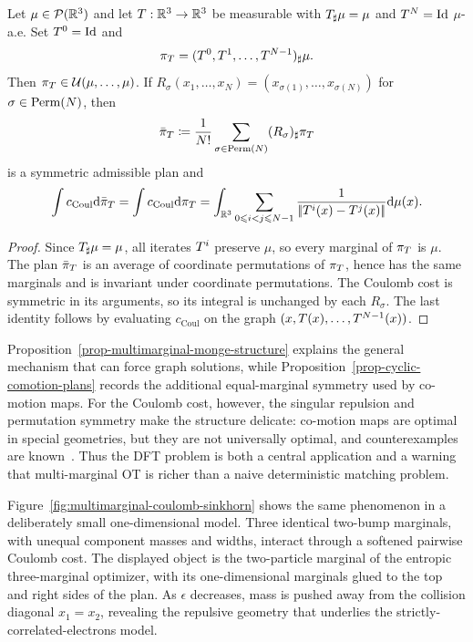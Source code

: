 \begin{prop}\label{prop-cyclic-comotion-plans}
	Let $\mu\in\mathcal{P}(\mathbb{R}^3)$ and let $T:\mathbb{R}^3\to\mathbb{R}^3$ be measurable with $T_\sharp\mu=\mu$ and $T^N=\mathrm{Id}$ $\mu$-a.e. Set $T^0=\mathrm{Id}$ and
	\[
		\pi_T=(T^0,T^1,\ldots,T^{N-1})_\sharp\mu .
	\]
	Then $\pi_T\in\mathcal{U}(\mu,\ldots,\mu)$. If $R_\sigma(x_1,\ldots,x_N)=(x_{\sigma(1)},\ldots,x_{\sigma(N)})$ for $\sigma\in\mathrm{Perm}(N)$, then
	\[
		\bar\pi_T\coloneqq\frac1{N!}\sum_{\sigma\in\mathrm{Perm}(N)}(R_\sigma)_\sharp\pi_T
	\]
	is a symmetric admissible plan and
	\[
		\int c_{\mathrm{Coul}}\mathrm{d}\bar\pi_T
		=
		\int c_{\mathrm{Coul}}\mathrm{d}\pi_T
		=
		\int_{\mathbb{R}^3}
		\sum_{0\leqslant i<j\leqslant N-1}
		\frac{1}{|\!| T^i(x)-T^j(x) |\!|}\mathrm{d}\mu(x).
	\]
\end{prop}
\begin{proof}
	Since $T_\sharp\mu=\mu$, all iterates $T^i$ preserve $\mu$, so every marginal of $\pi_T$ is $\mu$. The plan $\bar\pi_T$ is an average of coordinate permutations of $\pi_T$, hence has the same marginals and is invariant under coordinate permutations. The Coulomb cost is symmetric in its arguments, so its integral is unchanged by each $R_\sigma$. The last identity follows by evaluating $c_{\mathrm{Coul}}$ on the graph $(x,T(x),\ldots,T^{N-1}(x))$.
\end{proof}

Proposition~\ref{prop-multimarginal-monge-structure} explains the general mechanism that can force graph solutions, while Proposition~\ref{prop-cyclic-comotion-plans} records the additional equal-marginal symmetry used by co-motion maps. For the Coulomb cost, however, the singular repulsion and permutation symmetry make the structure delicate: co-motion maps are optimal in special geometries, but they are not universally optimal, and counterexamples are known~\cite{ColomboStraCoulombCounterexamples,BindiniDePascaleKausamoDeterministicCoulomb}. Thus the DFT problem is both a central application and a warning that multi-marginal OT is richer than a naive deterministic matching problem.

Figure~\ref{fig:multimarginal-coulomb-sinkhorn} shows the same phenomenon in a deliberately small one-dimensional model. Three identical two-bump marginals, with unequal component masses and widths, interact through a softened pairwise Coulomb cost. The displayed object is the two-particle marginal of the entropic three-marginal optimizer, with its one-dimensional marginals glued to the top and right sides of the plan. As $\epsilon$ decreases, mass is pushed away from the collision diagonal $x_1=x_2$, revealing the repulsive geometry that underlies the strictly-correlated-electrons model.


